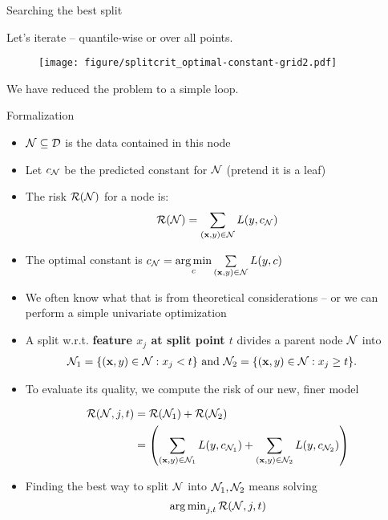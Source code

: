 \documentclass[11pt,compress,t,notes=noshow, xcolor=table]{beamer}
\begin{document}
\begin{vbframe}{Searching the best split}

Let's iterate -- quantile-wise or over all points.
\begin{figure}
\texttt{[image: figure/splitcrit\_optimal-constant-grid2.pdf]} 
\end{figure}

We have reduced the problem to a simple loop.

\end{vbframe}

\begin{vbframe}{Formalization}

\begin{itemize}
\item $\mathcal{N} \subseteq \mathcal{D}$ is the data contained in this node
\item Let $c_{\mathcal{N}}$ be the predicted constant for $\mathcal{N}$ (pretend it is a leaf)
\item The risk $\mathcal{R}(\mathcal{N})$ for a node is:
  $$\mathcal{R}(\mathcal{N}) = \sum\limits_{(\mathbf{x}, y) \in \mathcal{N}} L(y, c_{\mathcal{N}})$$
\item The optimal constant is $c_{\mathcal{N}} = \mathop{\mathrm{arg\,min}}\limits_c \sum\limits_{(\mathbf{x}, y) \in \mathcal{N}} L(y, c)$ 
\item We often know what that is from theoretical considerations -- or we can perform a simple univariate optimization
\end{itemize}

\framebreak

\begin{itemize}
\item A split w.r.t. \textbf{feature $x_j$ at split point $t$} divides a parent node $\mathcal{N}$ into 
  \begin{align*}
    \mathcal{N}_1 &= \{ (\mathbf{x}, y) \in \mathcal{N}: x_j < t \} \text{ and } \mathcal{N}_2 = \{ (\mathbf{x}, y) \in \mathcal{N}: x_j \geq t \}.
  \end{align*}
\item   
  To evaluate its quality, we compute the risk of our new, finer model
  
     \begin{align*}
      \mathcal{R}(\mathcal{N}, j, t) &=  \mathcal{R}(\mathcal{N}_1) +  \mathcal{R}(\mathcal{N}_2) \\
                  &= \left(\sum\limits_{(\mathbf{x},y) \in \mathcal{N}_1} L(y, c_{\mathcal{N}_1}) + \sum\limits_{(\mathbf{x},y) \in \mathcal{N}_2} L(y, c_{\mathcal{N}_2})\right)
      \end{align*}
  \item Finding the best way to split $\mathcal{N}$ into $\mathcal{N}_1, \mathcal{N}_2$ means solving
  $$\operatorname{arg\,min}_{j, t} \mathcal{R}(\mathcal{N}, j, t)$$
\end{itemize}


\end{vbframe}
\end{document}
